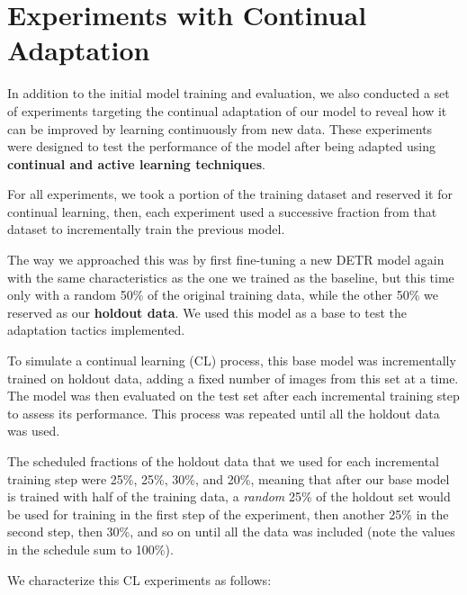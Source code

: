 \documentclass[../main.tex]{subfiles}
\begin{document}
    \section{Experiments with Continual Adaptation} \label{sec:adaptive_experiments}
    \vspace{-0.2cm}

    In addition to the initial model training and evaluation, we also conducted a set of experiments targeting the continual adaptation of our model to reveal how it can be improved by learning continuously from new data. These experiments were designed to test the performance of the model after being adapted using \textbf{continual and active learning techniques}.
    
    For all experiments, we took a portion of the training dataset and reserved it for continual learning, then, each experiment used a successive fraction from that dataset to incrementally train the previous model.
    
    The way we approached this was by first fine-tuning a new DETR model again with the same characteristics as the one we trained as the baseline, but this time only with a random 50\% of the original training data, while the other 50\% we reserved as our \textbf{holdout data}. We used this model as a base to test the adaptation tactics implemented.

    To simulate a continual learning (CL) process, this base model was incrementally trained on holdout data, adding a fixed number of images from this set at a time. The model was then evaluated on the test set after each incremental training step to assess its performance. This process was repeated until all the holdout data was used.

    The scheduled fractions of the holdout data that we used for each incremental training step were 25\%, 25\%, 30\%, and 20\%, meaning that after our base model is trained with half of the training data, a \textit{random} 25\% of the holdout set would be used for training in the first step of the experiment, then another 25\% in the second step, then 30\%, and so on until all the data was included (note the values in the schedule sum to 100\%).

    We characterize this CL experiments as follows:
\end{document}
